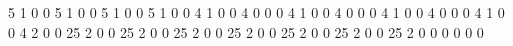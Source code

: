5
1
0
0
5
1
0
0
5
1
0
0
5
1
0
0
4
1
0
0
4
0
0
0
4
1
0
0
4
0
0
0
4
1
0
0
4
0
0
0
4
1
0
0
4
2
0
0
25
2
0
0
25
2
0
0
25
2
0
0
25
2
0
0
25
2
0
0
25
2
0
0
25
2
0
0
0
0
0
0
